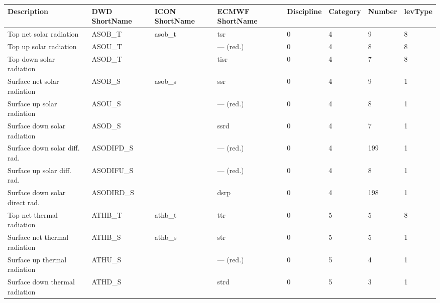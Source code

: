 \documentclass[11pt,notitlepage]{article}  %
\begin{document}
\vspace{1cm}
\hspace{-2cm}
\begin{centering}
\begin{tabular}{l p{2.5cm} p{2.5cm} p{2.5cm} l l l l}  

\textbf{Description}           & \textbf{DWD \linebreak ShortName} 
                               & \textbf{ICON \linebreak ShortName} 
                               & \textbf{ECMWF \linebreak ShortName} 
                               & \textbf{Discipline} & \textbf{Category} & \textbf{Number} & \textbf{levType} \\
\hline                                                                                                                                                                          

Top net solar radiation        &  ASOB\_T     &  asob\_t     &  tsr        &  0        &  4      &  9       &  8      \\
Top up solar radiation         &  ASOU\_T     &              &  --- (red.) &  0        &  4      &  8       &  8      \\
Top down solar radiation       &  ASOD\_T     &              &  tisr       &  0        &  4      &  7       &  8      \\
Surface net solar radiation    &  ASOB\_S     &  asob\_s     &  ssr        &  0        &  4      &  9       &  1      \\
Surface up solar radiation     &  ASOU\_S     &              &  --- (red.) &  0        &  4      &  8       &  1      \\
Surface down solar radiation   &  ASOD\_S     &              &  ssrd       &  0        &  4      &  7       &  1      \\
\hline 
Surface down solar diff. rad.  &  ASODIFD\_S  &              &  --- (red.) &  0        &  4      &  199     &  1      \\
Surface up solar diff. rad.    &  ASODIFU\_S  &              &  --- (red.) &  0        &  4      &  8       &  1      \\
Surface down solar direct rad. &  ASODIRD\_S  &              &  dsrp       &  0        &  4      &  198     &  1      \\
\hline 
Top net thermal radiation      &  ATHB\_T     &  athb\_t     &  ttr        &  0        &  5      &  5       &  8      \\
Surface net thermal radiation  &  ATHB\_S     &  athb\_s     &  str        &  0        &  5      &  5       &  1      \\
Surface up thermal radiation   &  ATHU\_S     &              &  --- (red.) &  0        &  5      &  4       &  1      \\
Surface down thermal radiation &  ATHD\_S     &              &  strd       &  0        &  5      &  3       &  1      \\

\hline
\end{tabular}
\end{centering}
\vspace{1cm}
\end{document}
